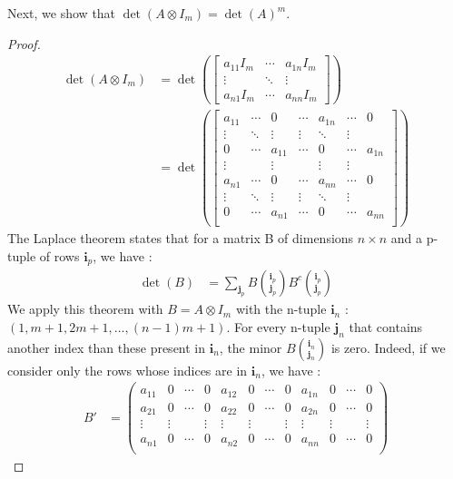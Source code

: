 \documentclass[11pt]{article}
\newcommand{\kp}{\otimes} %
\begin{document}
Next, we show that \(\det(A \kp I_m) = \det(A)^m\).
\begin{proof}
\begin{align*}
\det(A \kp I_m) &= \det \left(\begin{bmatrix}
a_{11} I_m & \cdots & a_{1n} I_m \\
\vdots & \ddots & \vdots \\
a_{n1} I_m & \cdots & a_{nn} I_m
\end{bmatrix}\right)\\
&=\det \left(\begin{bmatrix}
a_{11} & \cdots & 0 & \cdots & a_{1n} & \cdots & 0\\
\vdots & \ddots & \vdots & \vdots & \ddots & \vdots \\
0 & \cdots & a_{11} & \cdots & 0 & \cdots & a_{1n}\\
\vdots &  & \vdots &  & \vdots & \vdots \\
a_{n1} & \cdots & 0 & \cdots & a_{nn} & \cdots & 0\\
\vdots & \ddots & \vdots & \vdots & \ddots & \vdots \\
0 & \cdots & a_{n1} & \cdots & 0 & \cdots & a_{nn}\\
\end{bmatrix}\right)
\end{align*}
The Laplace theorem states that for a matrix B of dimensions \(n\times n\) and a p-tuple of rows $\bm{i}_p$, we have :
\begin{align*}
\det(B) &= \sum_{\bm{j}_p} B {\bm{i}_p\choose \bm{j}_p} B^c {\bm{i}_p\choose \bm{j}_p}
\end{align*}
We apply this theorem with $B=A \kp I_m$ with the n-tuple $\bm{i}_n$ : $(1,m+1,2m+1,...,(n-1)m+1)$. For every n-tuple $\bm{j}_n$ that contains another index than these present in $\bm{i}_n$, the minor $B {\bm{i}_n\choose \bm{j}_n}$ is zero. Indeed, if we consider only the rows whose indices are in $\bm{i}_n$, we have :
\begin{align*}
B'&=\begin{pmatrix}
a_{11} & 0 & \cdots & 0 & a_{12} & 0 & \cdots & 0 & a_{1n} & 0 & \cdots & 0\\
a_{21} & 0 & \cdots & 0 & a_{22} & 0 & \cdots & 0 & a_{2n} & 0 & \cdots & 0\\
\vdots & \vdots & & \vdots & \vdots & \vdots & & \vdots & \vdots & \vdots & & \vdots \\
a_{n1} & 0 & \cdots & 0 & a_{n2} & 0 & \cdots & 0 & a_{nn} & 0 & \cdots & 0 \\
\end{pmatrix}
\end{align*}


\end{proof}
\end{document}
